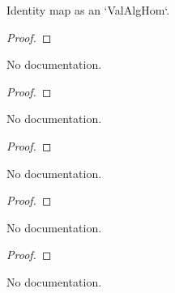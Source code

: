 \begin{definition}
\begin{theorem}\label{ValAlgHom.coe_id}
        \leanok
                Identity map as an `ValAlgHom`.
    \end{theorem}

\begin{proof}
    \leanok
\end{proof}

\begin{theorem}\label{ValAlgHom.id_toValRingHom}
        \leanok
                No documentation.
    \end{theorem}

\begin{proof}
    \leanok
\end{proof}

\begin{theorem}\label{ValAlgHom.coe_comp}
        \leanok
                No documentation.
    \end{theorem}

\begin{proof}
    \leanok
\end{proof}

\begin{theorem}\label{ValAlgHom.comp_apply}
        \leanok
                No documentation.
    \end{theorem}

\begin{proof}
    \leanok
\end{proof}

\begin{theorem}\label{ValAlgHom.comp_toRingHom}
        \leanok
                No documentation.
    \end{theorem}

\begin{proof}
    \leanok
\end{proof}

\begin{theorem}\label{ValAlgHom.comp_assoc}
        \leanok
                No documentation.
    \end{theorem}


\end{definition}
